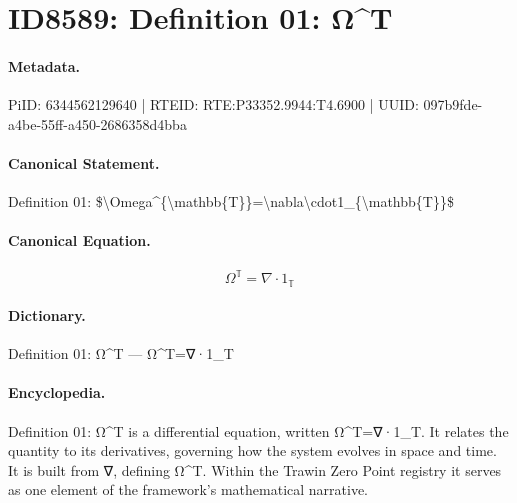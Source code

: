 \section*{ID8589: Definition 01: Ω\textasciicircum{}T}
\paragraph{Metadata.}
PiID: 6344562129640 | RTEID: RTE:P33352.9944:T4.6900 | UUID: 097b9fde-a4be-55ff-a450-2686358d4bba

\paragraph{Canonical Statement.}
Definition 01: \$\textbackslash{}Omega\textasciicircum{}\{\textbackslash{}mathbb\{T\}\}=\textbackslash{}nabla\textbackslash{}cdot1\_\{\textbackslash{}mathbb\{T\}\}\$

\paragraph{Canonical Equation.}
\[
\Omega^{\mathbb{T}}=\nabla\cdot1_{\mathbb{T}}
\]

\paragraph{Dictionary.}
Definition 01: Ω\textasciicircum{}T — Ω\textasciicircum{}T=∇·1\_T

\paragraph{Encyclopedia.}
Definition 01: Ω\textasciicircum{}T is a differential equation, written Ω\textasciicircum{}T=∇·1\_T. It relates the quantity to its derivatives, governing how the system evolves in space and time. It is built from ∇, defining Ω\textasciicircum{}T. Within the Trawin Zero Point registry it serves as one element of the framework's mathematical narrative.
